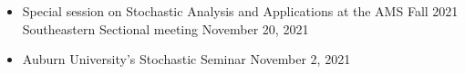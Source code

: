 \documentclass[letterpaper,12pt]{article}
\begin{document}
\begin{itemize}[itemsep = -2pt, topsep=0pt]
\item \noindent Special session on Stochastic Analysis and Applications at the AMS Fall 2021 \\ Southeastern Sectional meeting \hfill November 20, 2021

\item \noindent Auburn University's Stochastic Seminar \hfill November 2, 2021 
\end{itemize}
%
%
%	
%	
\end{document}
